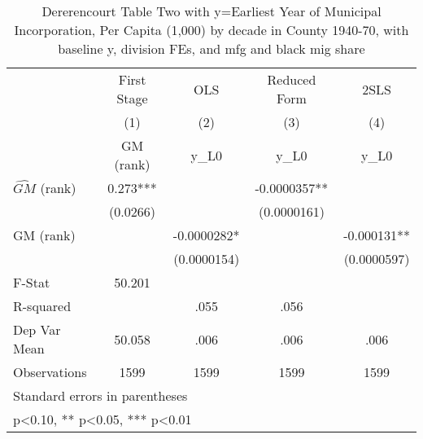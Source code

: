 \begin{table}[htbp]\centering
\def\sym#1{\ifmmode^{#1}\else\(^{#1}\)\fi}
\caption{Dererencourt Table Two with y=Earliest Year of Municipal Incorporation, Per Capita (1,000) by decade in County 1940-70, with baseline y, division FEs, and mfg and black mig share}
\begin{tabular}{l*{4}{c}}
\toprule
                    & First Stage   &         OLS   &Reduced Form   &        2SLS   \\
                    &\multicolumn{1}{c}{(1)}&\multicolumn{1}{c}{(2)}&\multicolumn{1}{c}{(3)}&\multicolumn{1}{c}{(4)}\\
                    &\multicolumn{1}{c}{GM  (rank)}&\multicolumn{1}{c}{y\_L0}&\multicolumn{1}{c}{y\_L0}&\multicolumn{1}{c}{y\_L0}\\
\midrule
$\hat{GM}$ (rank)   &       0.273***&               &  -0.0000357** &               \\
                    &    (0.0266)   &               & (0.0000161)   &               \\
\addlinespace
GM  (rank)          &               &  -0.0000282*  &               &   -0.000131** \\
                    &               & (0.0000154)   &               & (0.0000597)   \\
\midrule
F-Stat              &      50.201   &               &               &               \\
R-squared           &               &        .055   &        .056   &               \\
Dep Var Mean        &      50.058   &        .006   &        .006   &        .006   \\
Observations        &        1599   &        1599   &        1599   &        1599   \\
\bottomrule
\multicolumn{5}{l}{\footnotesize Standard errors in parentheses}\\
\multicolumn{5}{l}{\footnotesize * p<0.10, ** p<0.05, *** p<0.01}\\
\end{tabular}
\end{table}
